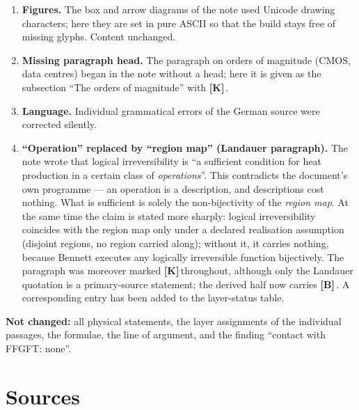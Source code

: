 \documentclass[11pt,a4paper]{article}
\newcommand{\LK}{\textcolor{layK}{\textbf{\footnotesize\textsf{[K]}}}\,}
\newcommand{\LB}{\textcolor{layB}{\textbf{\footnotesize\textsf{[B]}}}\,}
\begin{document}
\begin{enumerate}[leftmargin=1.6em,itemsep=0.4em]
        order here (hardware $\ne$ computational operation, then the hardware
        side, then continuous operation, then quantum computers) and carried as
        subsections of Section~\ref{sec:content}.
  \item \textbf{Figures.} The box and arrow diagrams of the note used Unicode
        drawing characters; here they are set in pure ASCII so that the build
        stays free of missing glyphs. Content unchanged.
  \item \textbf{Missing paragraph head.} The paragraph on orders of magnitude
        (CMOS, data centres) began in the note without a head; here it is given as
        the subsection “The orders of magnitude” with \LK.
  \item \textbf{Language.} Individual grammatical errors of the German source were
        corrected silently.
  \item \textbf{“Operation” replaced by “region map” (Landauer paragraph).} The
        note wrote that logical irreversibility is “a sufficient condition for
        heat production in a certain class of \emph{operations}”. This
        contradicts the document's own programme --- an operation is a
        description, and descriptions cost nothing. What is sufficient is solely
        the non-bijectivity of the \emph{region map}. At the same time the claim
        is stated more sharply: logical irreversibility coincides with the region
        map only under a declared realisation assumption (disjoint regions, no
        region carried along); without it, it carries nothing, because Bennett
        executes any logically irreversible function bijectively. The paragraph
        was moreover marked \LK throughout, although only the Landauer quotation
        is a primary-source statement; the derived half now carries \LB. A
        corresponding entry has been added to the layer-status table.
\end{enumerate}

\textbf{Not changed:} all physical statements, the layer assignments of the
individual passages, the formulae, the line of argument, and the finding “contact
with FFGFT: none”.

\clearpage
{}
{}
\section*{Sources}
\end{document}
